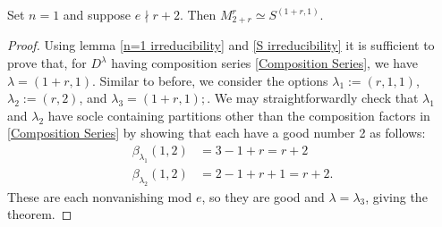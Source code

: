 \documentclass{amsart}
\begin{document}
\begin{theorem}
  Set $n = 1$ and suppose $e \nmid r + 2$.
  Then $M_{2 + r}^r \simeq S^{(1+r,1)}$.
\end{theorem}
\begin{proof}
  Using lemma \ref{n=1 irreducibility} and \ref{S irreducibility} it is sufficient to prove that, for $D^\lambda$ having composition series \eqref{Composition Series}, we have $\lambda = (1+r,1)$.
  Similar to before, we consider the options $\lambda_1 := (r,1,1)$, $\lambda_2 := (r,2)$, and $\lambda_3 = (1+r,1);$.
  We may straightforwardly check that $\lambda_1$ and $\lambda_2$ have socle containing partitions other than the composition factors in \eqref{Composition Series} by showing that each have a good number 2 as follows:
  \begin{align*}
    \beta_{\lambda_1}(1,2) &= 3 - 1 + r = r+2\\
    \beta_{\lambda_2}(1,2) &= 2 - 1 + r + 1 = r+2.
  \end{align*}
  These are each nonvanishing mod $e$, so they are good and $\lambda = \lambda_3$, giving the theorem.
\end{proof}
\fi
\end{document}
